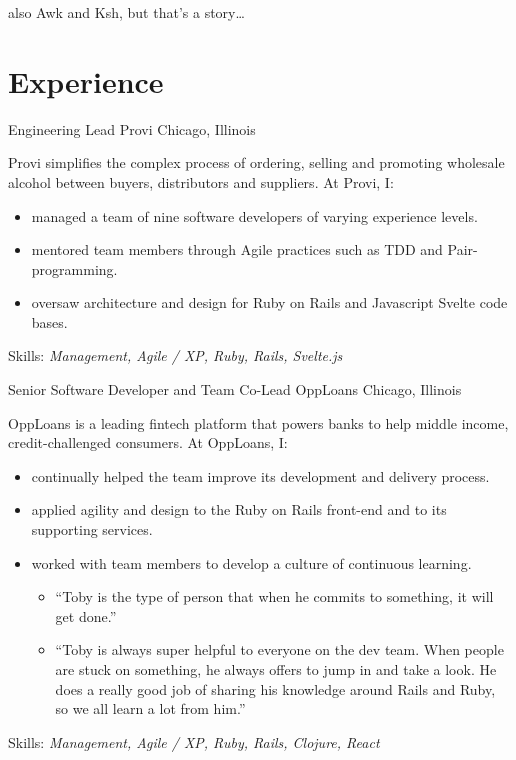 \documentclass[11pt,letterpaper]{moderncv}
\begin{document}
 {\tiny also Awk and Ksh, but that's a story\ldots}

\section{Experience}

 {Engineering Lead} {Provi} {Chicago,
  Illinois} {} { %
  Provi simplifies the complex process of ordering, selling and promoting
  wholesale alcohol between buyers, distributors and suppliers.  At Provi, I:
  \begin{itemize}
  \item managed a team of nine software developers of varying experience
    levels.
  \item mentored team members through Agile practices such as TDD and
    Pair-programming.
  \item oversaw architecture and design for Ruby on Rails and Javascript
    Svelte code bases.
  \end{itemize}
  Skills: \emph{Management, Agile / XP, Ruby, Rails, Svelte.js}
}

 {Senior Software Developer and Team Co-Lead}
  {OppLoans} {Chicago, Illinois} {} { %
  OppLoans is a leading fintech platform that powers banks to help middle
  income, credit-challenged consumers.  At OppLoans, I:
  \begin{itemize}
  \item continually helped the team improve its development and delivery
    process.
  \item applied agility and design to the Ruby on Rails front-end and to its
    supporting services.
  \item worked with team members to develop a culture of continuous learning.
    \begin{itemize}
    \item ``Toby is the type of person that when he commits to something, it
      will get done.''
    \item ``Toby is always super helpful to everyone on the dev team.  When
      people are stuck on something, he always offers to jump in and take a
      look.  He does a really good job of sharing his knowledge around Rails
      and Ruby, so we all learn a lot from him.''
    \end{itemize}
  \end{itemize}
  Skills: \emph{Management, Agile / XP, Ruby, Rails, Clojure, React}
}
\end{document}
